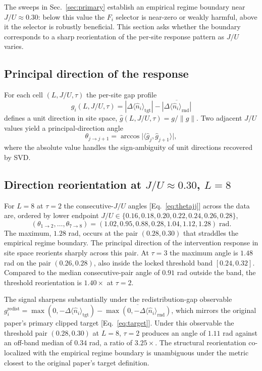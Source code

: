 \documentclass[aps,prresearch,reprint,amsmath,amssymb,longbibliography,floatfix]{revtex4-2}
\newcommand{\Fi}{F_i}
\newcommand{\nop}{\hat{n}}
\begin{document}
The sweeps in Sec.~\ref{sec:primary} establish an empirical regime
boundary near $J/U\approx 0.30$: below this value the $\Fi$ selector is
near-zero or weakly harmful, above it the selector is robustly
beneficial.
This section asks whether the boundary corresponds to a sharp
reorientation of the per-site response pattern as $J/U$ varies.

\subsection{Principal direction of the response}

For each cell $(L, J/U, \tau)$ the per-site gap profile
\begin{equation}
g_i(L,J/U,\tau) = |\Delta\langle\nop_i\rangle_{\mathrm{tgt}}|
  - \overline{|\Delta\langle\nop_i\rangle_{\mathrm{rnd}}|}
\end{equation}
defines a unit direction in site space,
$\hat g(L,J/U,\tau) = g/\|g\|$.
Two adjacent $J/U$ values yield a principal-direction angle
\begin{equation}
\label{eq:thetajj}
\theta_{j\to j+1} = \arccos\bigl|\langle\hat g_j,\hat g_{j+1}\rangle\bigr|,
\end{equation}
where the absolute value handles the sign-ambiguity of unit directions
recovered by SVD.

\subsection{Direction reorientation at $J/U\approx 0.30$, $L=8$}

For $L=8$ at $\tau=2$ the consecutive-$J/U$ angles
[Eq.~\eqref{eq:thetajj}] across the data are, ordered by lower endpoint
$J/U\in\{0.16,0.18,0.20,0.22,0.24,0.26,0.28\}$,
\begin{equation}
(\theta_{1\to 2},\dots,\theta_{7\to 8}) =
(1.02, 0.95, 0.88, 0.28, 1.04, 1.12, \mathbf{1.28})\;\text{rad}.
\end{equation}
The maximum, $1.28$ rad, occurs at the pair $(0.28, 0.30)$ that
straddles the empirical regime boundary.
The principal direction of the intervention response in site space
reorients sharply across this pair.
At $\tau=3$ the maximum angle is $1.48$ rad on the pair $(0.26, 0.28)$,
also inside the locked threshold band $[0.24, 0.32]$.
Compared to the median consecutive-pair angle of $0.91$ rad outside the
band, the threshold reorientation is $1.40\times$ at $\tau=2$.

The signal sharpens substantially under the redistribution-gap
observable
$g^{\mathrm{redist}}_i = \max(0,-\Delta\langle\nop_i\rangle_{\mathrm{tgt}})
- \overline{\max(0,-\Delta\langle\nop_i\rangle_{\mathrm{rnd}})}$,
which mirrors the original paper's primary clipped target
[Eq.~\eqref{eq:target}].
Under this observable the threshold pair $(0.28, 0.30)$ at $L=8$,
$\tau=2$ produces an angle of $1.11$ rad against an off-band median of
$0.34$ rad, a ratio of $\mathbf{3.25\times}$.
The structural reorientation co-localized with the empirical regime
boundary is unambiguous under the metric closest to the original
paper's target definition.
\end{document}
